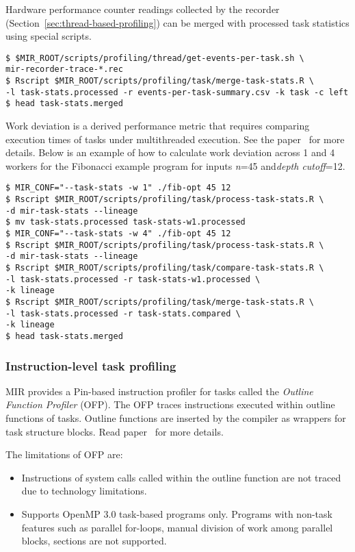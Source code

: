 \documentclass[11pt,a4paper]{article}
\begin{document}
Hardware performance counter readings collected by the recorder (Section~\ref{sec:thread-based-profiling}) can be merged with processed task statistics using special scripts.

\begin{lstlisting}[style=MyInputStyle]
$ $MIR_ROOT/scripts/profiling/thread/get-events-per-task.sh \
mir-recorder-trace-*.rec
$ Rscript $MIR_ROOT/scripts/profiling/task/merge-task-stats.R \
-l task-stats.processed -r events-per-task-summary.csv -k task -c left
$ head task-stats.merged
\end{lstlisting}

Work deviation is a derived performance metric that requires comparing execution times of tasks under multithreaded execution. See the paper~\cite{muddukrishna2015grain} for more details. Below is an example of how to calculate work deviation across 1 and 4 workers for the Fibonacci example program for inputs \textit{n}=45 and\textit{depth cutoff}=12.

\begin{lstlisting}[style=MyInputStyle]
$ MIR_CONF="--task-stats -w 1" ./fib-opt 45 12
$ Rscript $MIR_ROOT/scripts/profiling/task/process-task-stats.R \
-d mir-task-stats --lineage
$ mv task-stats.processed task-stats-w1.processed
$ MIR_CONF="--task-stats -w 4" ./fib-opt 45 12
$ Rscript $MIR_ROOT/scripts/profiling/task/process-task-stats.R \
-d mir-task-stats --lineage
$ Rscript $MIR_ROOT/scripts/profiling/task/compare-task-stats.R \
-l task-stats.processed -r task-stats-w1.processed \
-k lineage
$ Rscript $MIR_ROOT/scripts/profiling/task/merge-task-stats.R \
-l task-stats.processed -r task-stats.compared \
-k lineage
$ head task-stats.merged
\end{lstlisting}

\subsubsection{Instruction-level task profiling}\label{sec:instruction-level-task-profiling}

MIR provides a Pin-based instruction profiler for tasks called the \textit{Outline Function Profiler} (OFP).
The OFP traces instructions executed within outline functions of tasks.
Outline functions are inserted by the compiler as wrappers for task structure blocks.
Read paper~\cite{muddukrishna2015characterizing} for more details.

The limitations of OFP are:
\begin{itemize}
    \item Instructions of system calls called within the outline function are not traced due to technology limitations.
    \item Supports OpenMP 3.0 task-based programs only. Programs with non-task features such as parallel for-loops, manual division of work among parallel blocks, sections are not supported.
\end{itemize}
\end{document}
